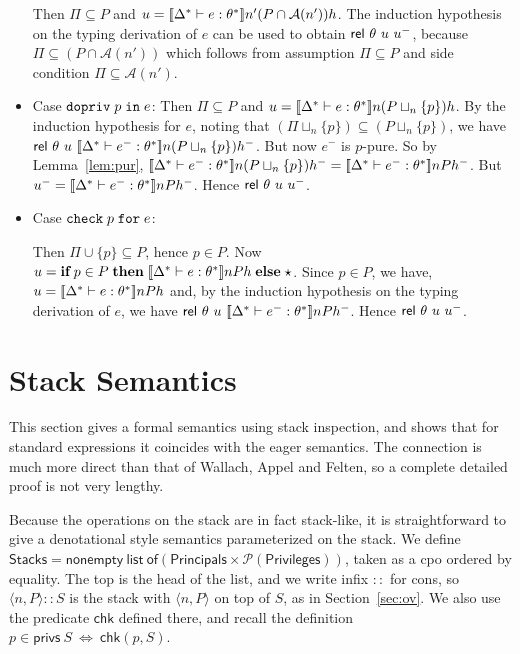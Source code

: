 \documentclass[submission,copyright,creativecommons]{eptcs}
\newcommand{\mifthenelse}[3]{\MIF\;#1\;\MTHEN\;#2\;\MELSE\;#3}
\newcommand{\enable}[2]{\ENABLE\;#1\;\IN\;#2}
\newcommand{\chk}[2]{\CHK\;#1\;\FOR\;#2}
\newcommand{\FOR}{\mbox{\texttt{for}}}
\newcommand{\IN}{\mbox{\texttt{in}}}
\newcommand{\MTHEN}{{\textbf{then}}}
\newcommand{\MELSE}{{\textbf{else}}}
\newcommand{\MIF}{{\textbf{if}}}
\newcommand{\A}{\mathcal{A}}
\renewcommand{\P}{\mathcal{P}}
\newcommand{\ldb}{[\![}
\newcommand{\rdb}{]\!]}
\newcommand{\means}[1]{\ldb {#1}\rdb}
\newcommand{\union}{\cup}
\newcommand{\intersect}{\cap}
\newcommand{\proves}{\vdash}
\newcommand{\tuple}[1]{\langle #1 \rangle}
\newcommand{\PRINC}{{\mathsf{Principals}}}
\newcommand{\PRIV}{{\mathsf{Privileges}}}
\newcommand{\ENABLE}{\mbox{\texttt{dopriv}}}
\newcommand{\CHK}{\mbox{\texttt{check}}}
\renewcommand{\check}{\textsf{chk}}
\newcommand{\privs}{\textsf{privs}}
\newcommand{\Rel}{\textsf{rel}}
\newcommand{\stacks}{\textsf{Stacks}}
\newcommand{\n}{n} \newcommand{\p}{p} \newcommand{\Ps}{\Pi} \newcommand{\h}{h}
\renewcommand{\iff}{\mathbin{\:\Leftrightarrow\:}}
\newenvironment{xproof}{\begin{trivlist}\item[\hskip\labelsep{\bf  
Proof:}]}{\end{trivlist}}
\begin{document}
\begin{xproof}
\begin{itemize}
Then $\Ps\subseteq P$ and 
$u=\means{\Delta^*\proves e:\th^*}\n'(P\intersect\A(\n')) \h$. 
The induction hypothesis on the typing derivation
of $e$ can be used to obtain $\Rel~ {\th}~u~u^-$, 
because $\Ps\subseteq(P\intersect\A(\n'))$ which follows from 
assumption $\Ps\subseteq P$ and side condition $\Ps\subseteq \A(\n')$.
\item Case $\enable{\p}{e}$:
Then $\Ps\subseteq P$ and 
$u=\means{\Delta^*\proves e:\th^*}\n(P\sqcup_{\n}\{\p\}) \h$.
By the induction hypothesis for $e$, noting that 
$(\Ps\sqcup_{\n}\{\p\})\subseteq(P\sqcup_{\n}\{\p\})$, we have 
$\Rel~\th~u~\means{\Delta^*\proves e^-:\th^*}\n(P\sqcup_{\n}\{\p\}) \h^-$.
But now $e^-$ is $\p$-pure. So by Lemma~\ref{lem:pur},
$\means{\Delta^*\proves e^-:\th^*}\n(P\sqcup_{\n}\{\p\}) \h^- =
\means{\Delta^*\proves e^-:\th^*}\n P\h^-$. 
But $u^-=\means{\Delta^*\proves e^-:\th^*}\n P\h^-$. 
Hence $\Rel~\th~u~u^-$.
\item Case $\chk{p}{e}$:
\begin{sloppypar}
Then $\Ps\union\{\p\}\subseteq P$, hence $\p\in P$.
Now \( u=\mifthenelse{\p\in P}{\means{\Delta^*\proves e:\th^*}\n P \h}{\star} \).
Since $\p\in P$, we have,
$u=\means{\Delta^*\proves e:\th^*}\n P \h$ and, by the induction
hypothesis on the typing derivation of $e$, we have 
$\Rel~\th~u~\means{\Delta^*\proves e^-:\th^*}\n P \h^-$. Hence
$\Rel~ {\th}~u~u^-$.
\end{sloppypar}
\end{itemize}
\end{xproof}
\section{Stack Semantics}
\label{sec:stk}


This section gives a formal semantics using stack inspection, and
shows that for standard expressions it coincides with the eager
semantics.  The connection is much more direct than that of Wallach,
Appel and Felten, so a complete detailed proof is not very lengthy.

Because the operations on the stack are in fact stack-like, it is
straightforward to give a denotational style semantics parameterized
on the stack.  We define $\stacks =
\mathsf{nonempty~list~of}(\PRINC\times\P(\PRIV) )$, taken as a cpo ordered by
equality.  The top is the head of the list, and we write infix $::$
for cons, so $\tuple{\n,P}::S$ is the stack with $\tuple{\n,P}$ on top
of $S$, as in Section~\ref{sec:ov}.  We also use the predicate
$\check$ defined there, and recall the definition $p\in \privs~S \iff
\check(p,S)$.
\end{document}

